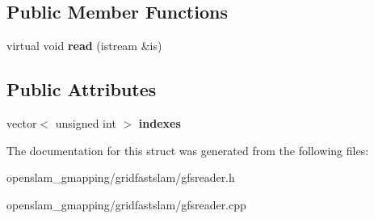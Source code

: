 \subsection*{Public Member Functions}
\begin{DoxyCompactItemize}
\item 
\mbox{\label{structGMapping_1_1GFSReader_1_1ResampleRecord_ab8ef8c8857867682acec7dce4510c1ab}} 
virtual void {\bfseries read} (istream \&is)
\end{DoxyCompactItemize}
\subsection*{Public Attributes}
\begin{DoxyCompactItemize}
\item 
\mbox{\label{structGMapping_1_1GFSReader_1_1ResampleRecord_a0d2572a6896d9cb2575960b887621039}} 
vector$<$ unsigned int $>$ {\bfseries indexes}
\end{DoxyCompactItemize}


The documentation for this struct was generated from the following files\+:\begin{DoxyCompactItemize}
\item 
openslam\+\_\+gmapping/gridfastslam/gfsreader.\+h\item 
openslam\+\_\+gmapping/gridfastslam/gfsreader.\+cpp\end{DoxyCompactItemize}

